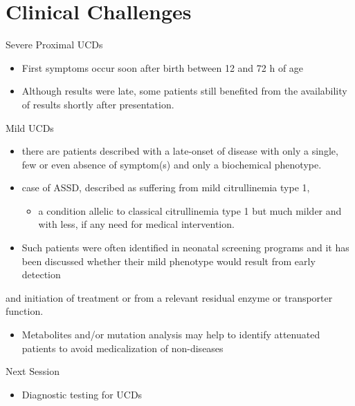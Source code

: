 \documentclass[presentation, smaller]{beamer}
\begin{document}
\section{Clinical Challenges}
\label{sec:orgheadline21}
\begin{frame}[label={sec:orgheadline18}]{Severe Proximal UCDs}
\begin{itemize}
\item First symptoms occur soon after birth between 12 and 72 h of age
\item Although results were late, some patients still benefited from the availability of results shortly after presentation.
\end{itemize}
\end{frame}

\begin{frame}[label={sec:orgheadline19}]{Mild UCDs}
\begin{itemize}
\item there are patients described with a late-onset of disease with only a single, few or even absence of symptom(s) and only a biochemical phenotype.
\item case of ASSD, described as suffering from mild citrullinemia type 1,
\begin{itemize}
\item a condition allelic to classical citrullinemia type 1 but much milder and with less, if any need for medical intervention.
\end{itemize}
\item Such patients were often identified in neonatal screening programs and it has been discussed whether their mild phenotype would result from early detection
\end{itemize}
and initiation of treatment or from a relevant residual enzyme or transporter function. 
\begin{itemize}
\item Metabolites and/or mutation analysis may help to identify attenuated patients to avoid medicalization of non-diseases
\end{itemize}
\end{frame}

\begin{frame}[label={sec:orgheadline20}]{Next Session}
\begin{itemize}
\item Diagnostic testing for UCDs
\end{itemize}
\end{frame}
\end{document}
